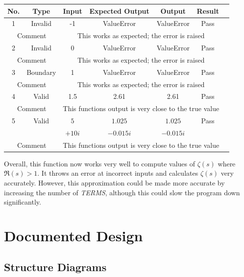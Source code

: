 \documentclass{article}
\begin{document}
\begin{table}[ht]
    \centering
    \begin{tabular}{|c|c|c|c|c|c|c|}
    \hline
    \textbf{No.} & \textbf{Type} & \textbf{Input} & \textbf{Expected Output} & \textbf{Output} & \textbf{Result}\\
    \hline
    \hline
    1 & Invalid & -1 & ValueError & ValueError & Pass\\
    \hline
    \multicolumn{2}{|c|}{Comment} & \multicolumn{4}{|c|}{This works as expected; the error is raised}\\
    \hline
    \hline
    2 & Invalid & 0 & ValueError & ValueError & Pass\\
    \hline
    \multicolumn{2}{|c|}{Comment} & \multicolumn{4}{|c|}{This works as expected; the error is raised}\\
    \hline
    \hline
    3 & Boundary & 1 & ValueError & ValueError & Pass\\
    \hline
    \multicolumn{2}{|c|}{Comment} & \multicolumn{4}{|c|}{This works as expected; the error is raised}\\
    \hline
    \hline
    4 & Valid & 1.5 & 2.61 & 2.61 & Pass\\
    \hline
    \multicolumn{2}{|c|}{Comment} & \multicolumn{4}{|c|}{This functions output is very close to the true value}\\
    \hline
    \hline
    5 & Valid & $5$ & $1.025$ & $1.025$ & Pass\\
      & & $+10i$ & $-0.015i$ & $-0.015i$  & \\
    \hline
    \multicolumn{2}{|c|}{Comment} & \multicolumn{4}{|c|}{This functions output is very close to the true value}\\
    \hline
    \end{tabular}
\end{table}

Overall, this function now works very well to compute values of $\zeta(s)$ where $\Re(s) > 1$. It throws an error at incorrect inputs and calculates $\zeta(s)$ very accurately. However, this approximation could be made more accurate by increasing the number of \textit{TERMS}, although this could slow the program down significantly.

\clearpage
\section{Documented Design}

\subsection{Structure Diagrams}
\end{document}
